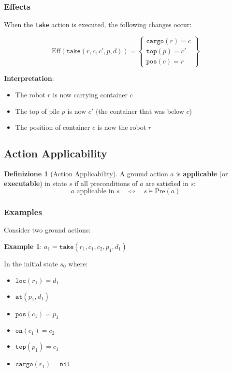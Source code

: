 \documentclass[11pt,a4paper]{article}
\theoremstyle{definition}
\newtheorem{definition}{Definizione}[section]
\theoremstyle{plain}
\theoremstyle{remark}
\begin{document}
\subsubsection{Effects}

When the \texttt{take} action is executed, the following changes occur:

\[
\text{Eff}(\texttt{take}(r, c, c', p, d)) = \left\{
\begin{array}{l}
\texttt{cargo}(r) = c \\
\texttt{top}(p) = c' \\
\texttt{pos}(c) = r
\end{array}
\right\}
\]

\textbf{Interpretation}:
\begin{itemize}
    \item The robot $r$ is now carrying container $c$
    \item The top of pile $p$ is now $c'$ (the container that was below $c$)
    \item The position of container $c$ is now the robot $r$
\end{itemize}

\subsection{Action Applicability}

\begin{definition}[Action Applicability]
A ground action $a$ is \textbf{applicable} (or \textbf{executable}) in state $s$ if all preconditions of $a$ are satisfied in $s$:
\[
a \text{ applicable in } s \quad \Leftrightarrow \quad s \models \text{Pre}(a)
\]
\end{definition}

\subsubsection{Examples}

Consider two ground actions:

\textbf{Example 1}: $a_1 = \texttt{take}(r_1, c_1, c_2, p_1, d_1)$

In the initial state $s_0$ where:
\begin{itemize}
    \item $\texttt{loc}(r_1) = d_1$
    \item $\texttt{at}(p_1, d_1)$
    \item $\texttt{pos}(c_1) = p_1$
    \item $\texttt{on}(c_1) = c_2$
    \item $\texttt{top}(p_1) = c_1$
    \item $\texttt{cargo}(r_1) = \texttt{nil}$
\end{itemize}
\end{document}
